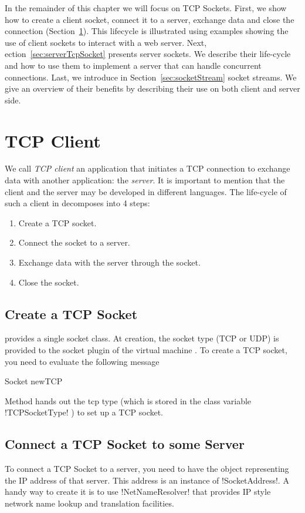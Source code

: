 \documentclass[a4paper,10pt,twoside]{book}
\begin{document}
In the remainder of this chapter we will focus on TCP Sockets.
First, we show how to create a client socket, connect it to a server, exchange data and close the connection (Section~\ref{sec:clientTcpSocket}).
This lifecycle is illustrated using examples showing the use of client sockets to interact with a web server. 
Next, ection~\ref{sec:serverTcpSocket} presents server sockets.
We describe their life-cycle and how to use them to implement a server that can handle concurrent connections.
Last, we introduce in Section~\ref{sec:socketStream} socket streams.
We give an overview of their benefits by describing their use on both client and server side.
 
\section{TCP Client}
\label{sec:clientTcpSocket}
We call \textit{TCP client}  an application that initiates a TCP connection to exchange data with another application: the \textit{server}.
It is important to mention that the client and the server may be developed in different languages.
The life-cycle of such a client in \pharo decomposes into 4 steps:
\begin{enumerate}
\item Create a TCP socket.
\item Connect the socket to a server.
\item Exchange data with the server through the socket.
\item Close the socket.
\end{enumerate}

\subsection{Create a TCP Socket}
\pharo provides a single socket class.
At creation, the socket type (TCP or UDP) is provided to the socket plugin of the virtual machine .
To create a TCP socket, you need to evaluate the following message 
\begin{code}{}
Socket newTCP
\end{code}
Method  hands out the tcp type (which is stored in the class variable \ct!TCPSocketType! ) to set up a TCP socket.

\subsection{Connect a TCP Socket to some Server}
To connect a TCP Socket to a server, you need to have the object representing the IP address of that server. This address is an instance of \ct!SocketAddress!.
A handy way to create it is to use \ct!NetNameResolver! that  provides IP style network name lookup and translation facilities.
\end{document}
